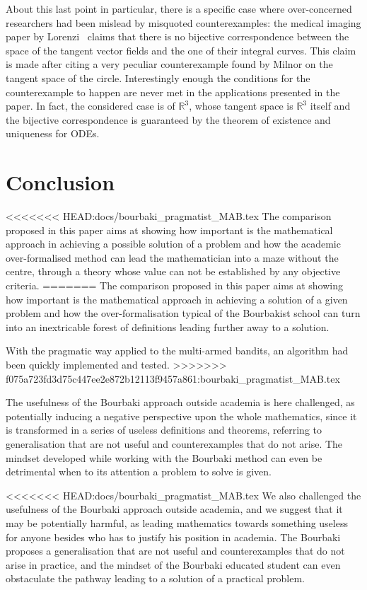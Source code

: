 \documentclass[]{scrartcl}
\theoremstyle{definition}
\begin{document}
About this last point in particular, there is a specific case where over-concerned researchers had been mislead by misquoted counterexamples: the medical imaging paper by Lorenzi~\cite{lorenzi2013geodesics} claims that there is no bijective correspondence between the space of the tangent vector fields and the one of their integral curves. This claim is made after citing a very peculiar counterexample found by Milnor on the tangent space of the circle.
Interestingly enough the conditions for the counterexample to happen are never met in the applications presented in the paper. In fact, the considered case is of $\mathbb{R}^3$, whose tangent space is $\mathbb{R}^3$ itself and the bijective correspondence is guaranteed by the theorem of existence and uniqueness for ODEs.


\section{Conclusion}

<<<<<<< HEAD:docs/bourbaki_pragmatist_MAB.tex
The comparison proposed in this paper aims at showing how important is the mathematical approach in achieving a possible solution of a problem and how the academic over-formalised method can lead the mathematician into a maze without the centre, through a theory whose value can not be established by any objective criteria.
=======
The comparison proposed in this paper aims at showing how important is the mathematical approach in achieving a solution of a given problem and how the over-formalisation typical of the Bourbakist school can turn into an inextricable forest of definitions leading further away to a solution.

With the pragmatic way applied to the multi-armed bandits, an algorithm had been quickly implemented and tested.
>>>>>>> f075a723fd3d75c447ee2e872b12113f9457a861:bourbaki_pragmatist_MAB.tex

The usefulness of the Bourbaki approach outside academia is here challenged, as potentially inducing a negative perspective upon the whole mathematics, since it is transformed in a series of useless definitions and theorems, referring to generalisation that are not useful and counterexamples that do not arise. The mindset developed while working with the Bourbaki method can even be detrimental when to its attention a problem to solve is given.

<<<<<<< HEAD:docs/bourbaki_pragmatist_MAB.tex
We also challenged the usefulness of the Bourbaki approach outside academia, and we suggest that it may be potentially harmful, as leading mathematics towards something useless for anyone besides who has to justify his position in academia. The Bourbaki proposes a generalisation that are not useful and counterexamples that do not arise in practice, and the mindset of the Bourbaki educated student can even obstaculate the pathway leading to a solution of a practical problem.
\end{document}
